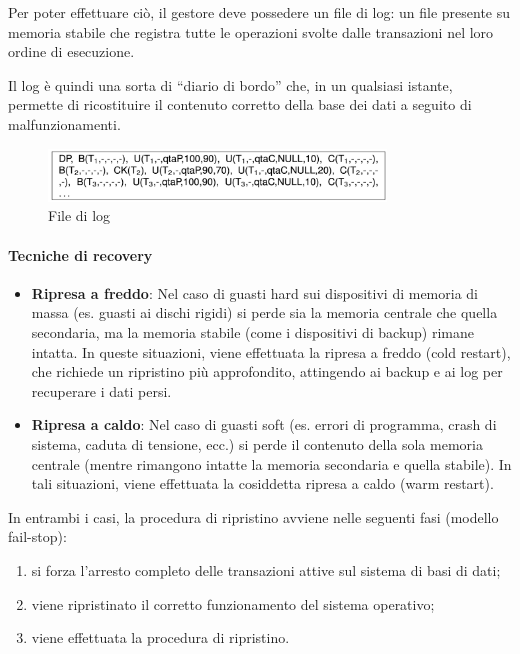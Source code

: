 Per poter effettuare ciò, il gestore deve possedere un file di log: un file presente su memoria stabile che registra tutte le operazioni svolte dalle transazioni nel loro ordine di esecuzione.

Il log è quindi una sorta di “diario di bordo” che, in un qualsiasi istante, permette di ricostituire il contenuto corretto della base dei dati a seguito di malfunzionamenti.

\begin{figure}[h]
    \centering
    \includegraphics[width=0.8\textwidth]{Media/log.png}
    \caption{File di log}
    \label{fig:log}
\end{figure}

\paragraph{Tecniche di recovery}

\begin{itemize}
    \item \textbf{Ripresa a freddo}: Nel caso di guasti hard sui dispositivi di memoria di massa (es. guasti ai dischi rigidi) si perde sia la memoria centrale che quella secondaria, ma la memoria stabile (come i dispositivi di backup) rimane intatta. In queste situazioni, viene effettuata la ripresa a freddo (cold restart), che richiede un ripristino più approfondito, attingendo ai backup e ai log per recuperare i dati persi.
    \item \textbf{Ripresa a caldo}: Nel caso di guasti soft (es. errori di programma, crash di sistema, caduta di tensione, ecc.) si perde il contenuto della sola memoria centrale (mentre rimangono intatte la memoria secondaria e quella stabile). In tali situazioni, viene effettuata la cosiddetta ripresa a caldo (warm restart).
\end{itemize}

In entrambi i casi, la procedura di ripristino avviene nelle seguenti fasi (modello fail-stop):

\begin{enumerate}
    \item si forza l’arresto completo delle transazioni attive sul sistema di basi di dati;
    \item viene ripristinato il corretto funzionamento del sistema operativo;
    \item viene effettuata la procedura di ripristino.
\end{enumerate}
